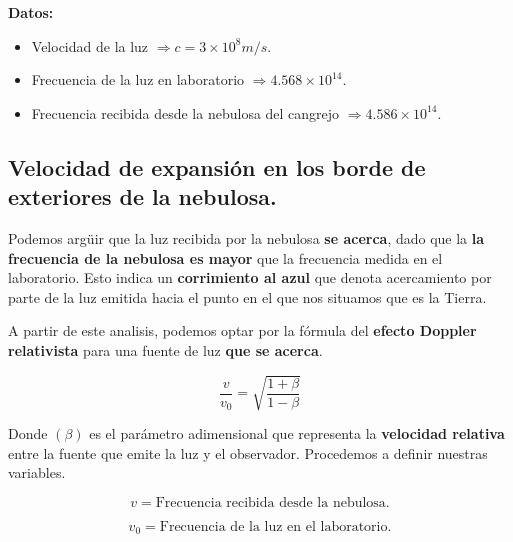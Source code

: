 \documentclass[a4paper,12pt]{article} %
\begin{document}
\begin{justify}
    \textbf{Datos:}
\end{justify}

\begin{itemize}
    \item Velocidad de la luz  \( \Rightarrow c = 3 \times 10^8 m/s. \)
    \item Frecuencia de la luz en laboratorio \( \Rightarrow 4.568 \times 10^{14}. \)
    \item Frecuencia recibida desde la nebulosa del cangrejo \( \Rightarrow 4.586 \times 10^{14}. \)

\end{itemize}

\vspace{\baselineskip}

\subsection{Velocidad de expansión en los borde de exteriores de la nebulosa.}

\vspace{\baselineskip}

\begin{justify}
    Podemos argüir que la luz recibida por la nebulosa \textbf{se acerca}, dado que la \textbf{la frecuencia de la nebulosa es mayor} que la frecuencia 
    medida en el laboratorio. Esto indica un \textbf{corrimiento al azul} que denota acercamiento por parte de la luz emitida hacia el punto en el que nos situamos 
    que es la Tierra. 
\end{justify}

\begin{justify}
    A partir de este analisis, podemos optar por la fórmula del \textbf{efecto Doppler relativista} para una fuente de luz \textbf{que se acerca}.
\end{justify}

\[ \frac{v}{v_0} = \sqrt{\frac{1 + \beta}{1- \beta}} \]

\begin{justify}
    Donde \( (\beta)\) es el parámetro adimensional que representa la \textbf{velocidad relativa} entre la fuente que emite la luz y el observador.
    Procedemos a definir nuestras variables.
\end{justify}

\[ v = \text{Frecuencia recibida desde la nebulosa.} \]

\[ v_0 = \text{Frecuencia de la luz en el laboratorio.} \]
\end{document}
